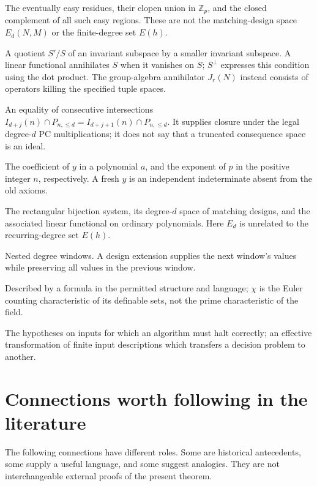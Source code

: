 \documentclass[11pt,a4paper,oneside,openany]{book}
\theoremstyle{definition}\newtheorem{definition}[theorem]{Definition}
\theoremstyle{remark}\newtheorem{remark}[theorem]{Remark}
\numberwithin{equation}{chapter}
\begin{document}
\begin{description}[style=nextline,leftmargin=1em,labelindent=0pt,labelwidth=0pt]
\item[$A_d(h),\mathcal E_d(h),\mathcal H_p(h)$] The eventually easy
residues, their clopen union in $\mathbb Z_p$, and the closed complement
of all such easy regions. These are not the matching-design space
$E_d(N,M)$ or the finite-degree set $E(h)$.
\item[Subquotient; annihilator] A quotient $S'/S$ of an invariant
subspace by a smaller invariant subspace. A linear functional
annihilates $S$ when it vanishes on $S$; $S^\perp$ expresses this
condition using the dot product. The group-algebra annihilator $J_r(N)$
instead consists of operators killing the specified tuple spaces.
\item[Plateau] An equality of consecutive intersections
$I_{d+j}(n)\cap P_{n,\le d}=I_{d+j+1}(n)\cap P_{n,\le d}$.
It supplies closure under the legal degree-$d$ PC multiplications;
it does not say that a truncated consequence space is an ideal.
\item[{$[y^1]a, v_p(n)$}] The coefficient of $y$ in a polynomial $a$,
and the exponent of $p$ in the positive integer $n$, respectively.
A fresh $y$ is an independent indeterminate absent from the old axioms.
\item[$B_{r,m},E_d(N,M),\Lambda_\psi$] The rectangular bijection
system, its degree-$d$ space of matching designs, and the associated
linear functional on ordinary polynomials. Here $E_d$ is unrelated
to the recurring-degree set $E(h)$.
\item[Filtration; extension] Nested degree windows. A design extension
supplies the next window's values while preserving all values in the
previous window.
\item[Definable; $\chi$] Described by a formula in the permitted
structure and language; $\chi$ is the Euler counting characteristic
of its definable sets, not the prime characteristic of the field.
\item[Promise; reduction] The hypotheses on inputs for which an
algorithm must halt correctly; an effective transformation of finite
input descriptions which transfers a decision problem to another.
\end{description}


\section{Connections worth following in the literature}
\label{tx:sec:literature-route}
The following connections have different roles. Some are historical
antecedents, some supply a useful language, and some suggest analogies.
They are not interchangeable external proofs of the present theorem.
\end{document}
